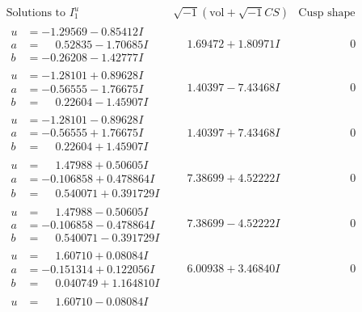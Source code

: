 \documentclass[1p]{elsarticle_modified}
\theoremstyle{definition}
\newcommand{\I}{\sqrt{-1}}
\begin{document}
$$\begin{array}{c|c|c}
\text{Solutions to }I^u_{1}& \I (\text{vol} + \sqrt{-1}CS) & \text{Cusp shape}\\
 \hline 
\begin{aligned}
u &= -1.29569 - 0.85412 I \\
a &= \phantom{-}0.52835 - 1.70685 I \\
b &= -0.26208 - 1.42777 I\end{aligned}
 & \phantom{-}1.69472 + 1.80971 I & \phantom{-0.000000 } 0 \\ \hline\begin{aligned}
u &= -1.28101 + 0.89628 I \\
a &= -0.56555 - 1.76675 I \\
b &= \phantom{-}0.22604 - 1.45907 I\end{aligned}
 & \phantom{-}1.40397 - 7.43468 I & \phantom{-0.000000 } 0 \\ \hline\begin{aligned}
u &= -1.28101 - 0.89628 I \\
a &= -0.56555 + 1.76675 I \\
b &= \phantom{-}0.22604 + 1.45907 I\end{aligned}
 & \phantom{-}1.40397 + 7.43468 I & \phantom{-0.000000 } 0 \\ \hline\begin{aligned}
u &= \phantom{-}1.47988 + 0.50605 I \\
a &= -0.106858 + 0.478864 I \\
b &= \phantom{-}0.540071 + 0.391729 I\end{aligned}
 & \phantom{-}7.38699 + 4.52222 I & \phantom{-0.000000 } 0 \\ \hline\begin{aligned}
u &= \phantom{-}1.47988 - 0.50605 I \\
a &= -0.106858 - 0.478864 I \\
b &= \phantom{-}0.540071 - 0.391729 I\end{aligned}
 & \phantom{-}7.38699 - 4.52222 I & \phantom{-0.000000 } 0 \\ \hline\begin{aligned}
u &= \phantom{-}1.60710 + 0.08084 I \\
a &= -0.151314 + 0.122056 I \\
b &= \phantom{-}0.040749 + 1.164810 I\end{aligned}
 & \phantom{-}6.00938 + 3.46840 I & \phantom{-0.000000 } 0 \\ \hline\begin{aligned}
u &= \phantom{-}1.60710 - 0.08084 I \\

\end{aligned}
\end{array}$$
\end{document}

